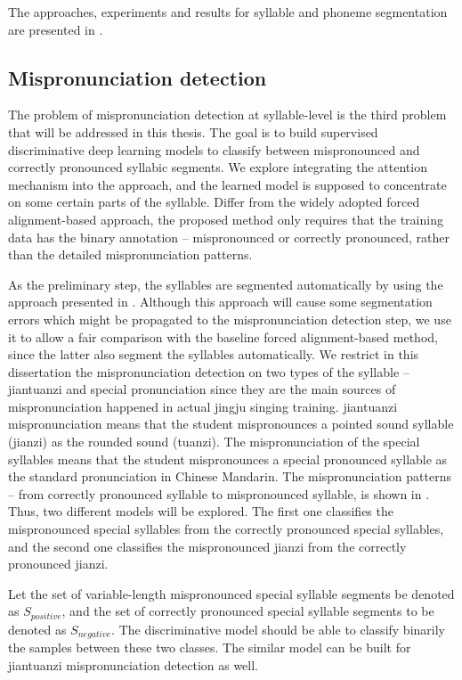 The approaches, experiments and results for syllable and phoneme segmentation are presented in .

\subsection{Mispronunciation detection}\label{sec:ch3:mispronunciation}

The problem of mispronunciation detection at syllable-level is the third problem that will be addressed in this thesis. The goal is to build supervised discriminative deep learning models to classify between mispronounced and correctly pronounced syllabic segments. We explore integrating the attention mechanism into the approach, and the learned model is supposed to concentrate on some certain parts of the syllable. Differ from the widely adopted forced alignment-based approach, the proposed method only requires that the training data has the binary annotation -- mispronounced or correctly pronounced, rather than the detailed mispronunciation patterns.

As the preliminary step, the syllables are segmented automatically by using the approach presented in . Although this approach will cause some segmentation errors which might be propagated to the mispronunciation detection step, we use it to allow a fair comparison with the baseline forced alignment-based method, since the latter also segment the syllables automatically. We restrict in this dissertation the mispronunciation detection on two types of the syllable -- \gls{jiantuanzi} and special pronunciation since they are the main sources of mispronunciation happened in actual jingju singing training. \Gls{jiantuanzi} mispronunciation means that the student mispronounces a pointed sound syllable (\gls{jianzi}) as the rounded sound (\gls{tuanzi}). The mispronunciation of the special syllables means that the student mispronounces a special pronounced syllable as the standard pronunciation in Chinese Mandarin. The mispronunciation patterns -- from correctly pronounced syllable to mispronounced syllable, is shown in . Thus, two different models will be explored. The first one classifies the mispronounced special syllables from the correctly pronounced special syllables, and the second one classifies the mispronounced \gls{jianzi} from the correctly pronounced \gls{jianzi}.

Let the set of variable-length mispronounced special syllable segments be denoted as $S_{positive}$, and the set of correctly pronounced special syllable segments to be denoted as $S_{negative}$. The discriminative model should be able to classify binarily the samples between these two classes. The similar model can be built for \gls{jiantuanzi} mispronunciation detection as well. 

